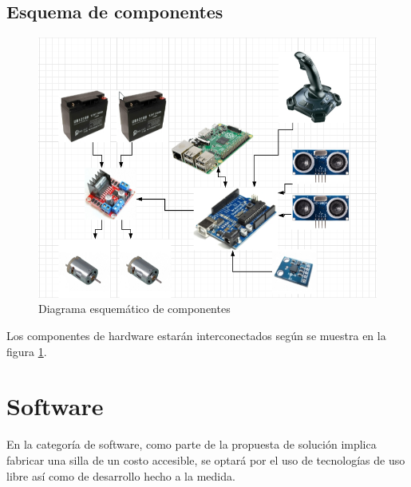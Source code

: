 \subsection{Esquema de componentes}

\begin{figure}[th]
    \centering
    \includegraphics[width=.9\textwidth]{Figures/components.png}
    \decoRule
    \caption{Diagrama esquem\'atico de componentes}
    \label{fig:components}
\end{figure}
Los componentes de hardware estar\'an interconectados seg\'un se muestra en la
figura \ref{fig:components}.

\section{Software}

En la categor\'ia de software, como parte de la propuesta de soluci\'on implica
fabricar una silla de un costo accesible, se optar\'a por el uso de
tecnolog\'ias de uso libre as\'i como de desarrollo hecho a la medida.

